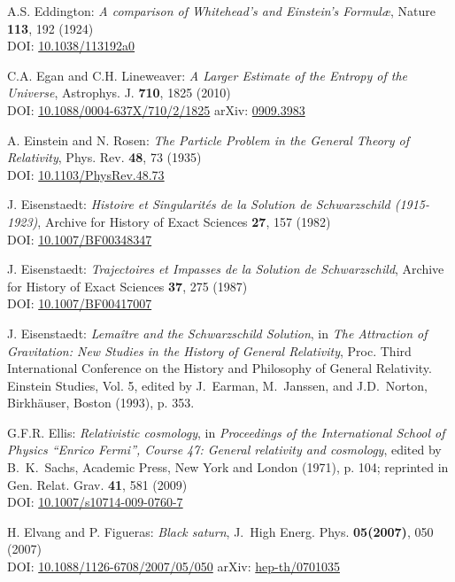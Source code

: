 \begin{thebibliography}{123}
A.S. Eddington: {\em A comparison of Whitehead's and Einstein's Formul\ae},
Nature {\bf 113}, 192 (1924) \\
DOI: \href{https://doi.org/10.1038/113192a0}{10.1038/113192a0}

C.A. Egan and C.H. Lineweaver:
{\em A Larger Estimate of the Entropy of the Universe},
Astrophys. J. {\bf 710}, 1825 (2010)\\
DOI: \href{https://doi.org/10.1088/0004-637X/710/2/1825}{10.1088/0004-637X/710/2/1825}\hfill
arXiv: \href{https://arxiv.org/abs/0909.3983}{0909.3983}

A. Einstein and N. Rosen:
{\em The Particle Problem in the General Theory of Relativity},
Phys. Rev. {\bf 48}, 73 (1935) \\
DOI: \href{https://doi.org/10.1103/PhysRev.48.73}{10.1103/PhysRev.48.73}

J. Eisenstaedt:
{\em Histoire et Singularit\'es de la Solution de Schwarzschild (1915-1923)},
Archive for History of Exact Sciences {\bf 27}, 157 (1982) \\
DOI: \href{https://doi.org/10.1007/BF00348347}{10.1007/BF00348347}

J. Eisenstaedt:
{\em Trajectoires et Impasses de la Solution de Schwarzschild},
Archive for History of Exact Sciences {\bf 37}, 275 (1987) \\
DOI: \href{https://doi.org/10.1007/BF00417007}{10.1007/BF00417007}

J. Eisenstaedt: {\em Lemaître and the Schwarzschild Solution}, in
{\em The Attraction of Gravitation: New Studies in the History of
General Relativity}, Proc. Third International Conference on the History and Philosophy of General Relativity. Einstein
Studies, Vol. 5, edited by J.~Earman, M.~Janssen, and J.D.~Norton,
Birkhäuser, Boston (1993), p. 353.

G.F.R. Ellis:
{\em Relativistic cosmology},
in  {\em Proceedings of the International School of Physics ``Enrico Fermi'',
Course 47: General relativity and cosmology}, edited by B.~K.~Sachs,
Academic Press, New York and London (1971), p. 104;
reprinted in Gen. Relat. Grav. {\bf 41}, 581 (2009)\\
DOI: \href{https://doi.org/10.1007/s10714-009-0760-7}{10.1007/s10714-009-0760-7}

H. Elvang and P. Figueras:
{\em Black saturn},
J.~High Energ. Phys. {\bf 05(2007)}, 050 (2007)\\
DOI: \href{https://doi.org/10.1088/1126-6708/2007/05/050}{10.1088/1126-6708/2007/05/050}\hfill
arXiv: \href{https://arxiv.org/abs/hep-th/0701035}{hep-th/0701035}


\end{thebibliography}
